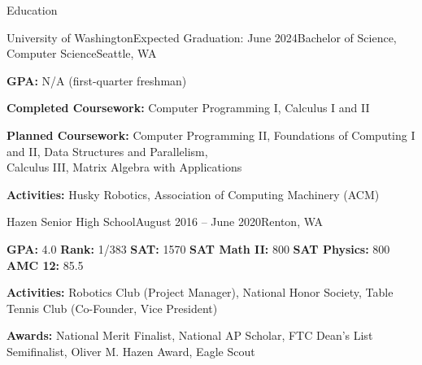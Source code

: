\documentclass{resume} %
\begin{document}
\vspace{-1.0em} %


\begin{rSection}{Education}

\begin{education}{University of Washington}{Expected Graduation: June 2024}{Bachelor of Science, Computer Science}{Seattle, WA}
\item {\bf GPA:} N/A (first-quarter freshman)
\item {\bf Completed Coursework:} Computer Programming I, Calculus I and II
\item {\bf Planned Coursework:} Computer Programming II, Foundations of Computing I and II, Data Structures and Parallelism,  \\ Calculus III, Matrix Algebra with Applications
\item {\bf Activities:} Husky Robotics, Association of Computing Machinery (ACM)
\end{education}

\begin{education}{Hazen Senior High School}{August 2016 – June 2020}{}{Renton, WA}
\item {\bf GPA:} 4.0 \hspace{5mm} {\bf Rank:} 1/383 \hspace{5mm} {\bf SAT:} 1570 \hspace{5mm} {\bf SAT Math II:} 800 \hspace{5mm} {\bf SAT Physics:} 800 \hspace{5mm} {\bf AMC 12:} 85.5
\item {\bf Activities:} Robotics Club (Project Manager), National Honor Society, Table Tennis Club (Co-Founder, Vice President)
\item {\bf Awards:} National Merit Finalist, National AP Scholar, FTC Dean's List Semifinalist, Oliver M. Hazen Award, Eagle Scout
\end{education}

\end{rSection}

\end{document}
